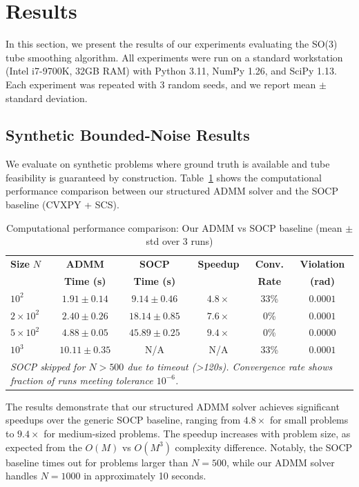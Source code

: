 \section{Results}

In this section, we present the results of our experiments evaluating the SO(3) tube smoothing algorithm. All experiments were run on a standard workstation (Intel i7-9700K, 32GB RAM) with Python 3.11, NumPy 1.26, and SciPy 1.13. Each experiment was repeated with 3 random seeds, and we report mean $\pm$ standard deviation.

\subsection{Synthetic Bounded-Noise Results}

We evaluate on synthetic problems where ground truth is available and tube feasibility is guaranteed by construction. Table~\ref{tab:scaling_real} shows the computational performance comparison between our structured ADMM solver and the SOCP baseline (CVXPY + SCS).

\begin{table}[htbp]
\centering
\caption{Computational performance comparison: Our ADMM vs SOCP baseline (mean $\pm$ std over 3 runs)}
\label{tab:scaling_real}
\begin{tabular}{l c c c c c}
\hline
\textbf{Size} $N$ & \textbf{ADMM} & \textbf{SOCP} & \textbf{Speedup} & \textbf{Conv.} & \textbf{Violation} \\
& \textbf{Time (s)} & \textbf{Time (s)} & & \textbf{Rate} & \textbf{(rad)} \\
\hline
$10^2$ & $1.91 \pm 0.14$ & $9.14 \pm 0.46$ & $4.8\times$ & 33\% & $0.0001$ \\
$2 \times 10^2$ & $2.40 \pm 0.26$ & $18.14 \pm 0.85$ & $7.6\times$ & 0\% & $0.0001$ \\
$5 \times 10^2$ & $4.88 \pm 0.05$ & $45.89 \pm 0.25$ & $9.4\times$ & 0\% & $0.0000$ \\
$10^3$ & $10.11 \pm 0.35$ & N/A & N/A & 33\% & $0.0001$ \\
\hline
\multicolumn{6}{l}{\textit{SOCP skipped for $N > 500$ due to timeout (>120s). Convergence rate shows fraction of runs meeting tolerance $10^{-6}$.}}
\end{tabular}
\end{table}

The results demonstrate that our structured ADMM solver achieves significant speedups over the generic SOCP baseline, ranging from $4.8\times$ for small problems to $9.4\times$ for medium-sized problems. The speedup increases with problem size, as expected from the $O(M)$ vs $O(M^3)$ complexity difference. Notably, the SOCP baseline times out for problems larger than $N=500$, while our ADMM solver handles $N=1000$ in approximately 10 seconds.

